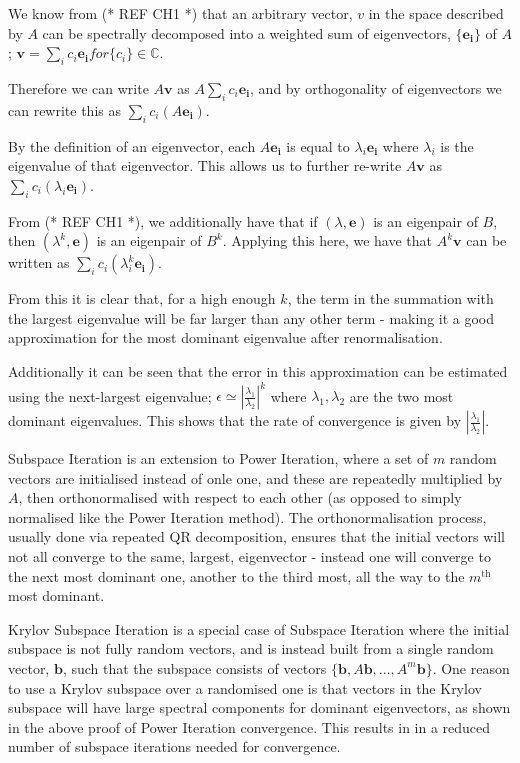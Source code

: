 We know from (* REF CH1 *) that an arbitrary vector, $v$ in the space described by $A$ can be spectrally decomposed into a weighted sum of eigenvectors, $\{\mathbf{e_{i}}\}$ of $A$; $\mathbf{v} = \sum_{i}{c_{i}\mathbf{e_{i}}} for \{c_{i}\} \in \mathbb{C}$.

Therefore we can write $A\mathbf{v}$ as $A\sum_{i}{c_{i}\mathbf{e_{i}}}$, and by orthogonality of eigenvectors we can rewrite this as $\sum_{i}{c_{i}\left(A\mathbf{e_{i}}\right)}$. 

By the definition of an eigenvector, each $A\mathbf{e_i}$ is equal to $\lambda_{i}\mathbf{e_i}$ where $\lambda_i$ is the eigenvalue of that eigenvector. This allows us to further re-write $A\mathbf{v}$ as $\sum_{i}{c_{i}\left(\lambda_{i}\mathbf{e_{i}}\right)}$. 

From (* REF CH1 *), we additionally have that if $(\lambda,\mathbf{e})$ is an eigenpair of $B$, then $(\lambda^{k},\mathbf{e})$ is an eigenpair of $B^{k}$. Applying this here, we have that $A^{k}\mathbf{v}$ can be written as $\sum_{i}{c_{i}\left(\lambda_{i}^{k}\mathbf{e_{i}}\right)}$. 

From this it is clear that, for a high enough $k$, the term in the summation with the largest eigenvalue will be far larger than any other term - making it a good approximation for the most dominant eigenvalue after renormalisation. 

Additionally it can be seen that the error in this approximation can be estimated using the next-largest eigenvalue; $\epsilon \simeq |\frac{\lambda_1}{\lambda_2}|^{k}$ where $\lambda_1, \lambda_2$ are the two most dominant eigenvalues. This shows that the rate of convergence is given by $|\frac{\lambda_1}{\lambda_2}|$.


Subspace Iteration is an extension to Power Iteration, where a set of $m$ random vectors are initialised instead of onle one, and these are repeatedly multiplied by $A$, then orthonormalised with respect to each other (as opposed to simply normalised like the Power Iteration method). The orthonormalisation process, usually done via repeated QR decomposition, ensures that the initial vectors will not all converge to the same, largest, eigenvector - instead one will converge to the next most dominant one, another to the third most, all the way to the $m^{\text{th}}$ most dominant.


Krylov Subspace Iteration is a special case of Subspace Iteration where the initial subspace is not fully random vectors, and is instead built from a single random vector, $\mathbf{b}$, such that the subspace consists of vectors $\{\mathbf{b}, A\mathbf{b},...,A^{m}\mathbf{b}\}$. One reason to use a Krylov subspace over a randomised one is that vectors in the Krylov subspace will have large spectral components for dominant eigenvectors, as shown in the above proof of Power Iteration convergence. This results in in a reduced number of subspace iterations needed for convergence.


